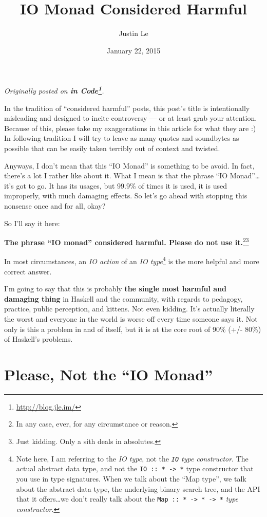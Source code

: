 \documentclass[]{article}
\title{IO Monad Considered Harmful}
\author{Justin Le}
\date{January 22, 2015}
\renewcommand{\href}[2]{#2\footnote{\url{#1}}}
\begin{document}
\maketitle

\emph{Originally posted on \textbf{\href{http://blog.jle.im/}{in
Code}}.}

In the tradition of ``considered harmful'' posts, this post's title is
intentionally misleading and designed to incite controversy --- or at
least grab your attention. Because of this, please take my exaggerations
in this article for what they are :) In following tradition I will try
to leave as many quotes and soundbytes as possible that can be easily
taken terribly out of context and twisted.

Anyways, I don't mean that this ``IO Monad'' is something to be avoid.
In fact, there's a lot I rather like about it. What I mean is that the
phrase ``IO Monad''\ldots{}it's got to go. It has its usages, but 99.9\%
of times it is used, it is used improperly, with much damaging effects.
So let's go ahead with stopping this nonsense once and for all, okay?

So I'll say it here:

\textbf{The phrase ``IO monad'' considered harmful. Please do not use
it.}\footnote{In any case, ever, for any circumstance or reason.}\footnote{Just
  kidding. Only a sith deals in absolutes.}

In most circumstances, an \emph{IO action} of an \emph{IO
type}\footnote{Note here, I am referring to the \emph{IO type}, not the
  \emph{\texttt{IO} type constructor}. The actual abstract data type,
  and not the \texttt{IO\ ::\ *\ -\textgreater{}\ *} type constructor
  that you use in type signatures. When we talk about the ``Map type'',
  we talk about the abstract data type, the underlying binary search
  tree, and the API that it offers\ldots{}we don't really talk about the
  \texttt{Map\ ::\ *\ -\textgreater{}\ *\ -\textgreater{}\ *} \emph{type
  constructor}.} is the more helpful and more correct answer.

I'm going to say that this is probably \textbf{the single most harmful
and damaging thing} in Haskell and the community, with regards to
pedagogy, practice, public perception, and kittens. Not even kidding.
It's actually literally the worst and everyone in the world is worse off
every time someone says it. Not only is this a problem in and of itself,
but it is at the core root of 90\% (+/- 80\%) of Haskell's problems.

\section{\texorpdfstring{Please, Not the ``IO
Monad''}{Please, Not the IO Monad}}\label{please-not-the-io-monad}
\end{document}
